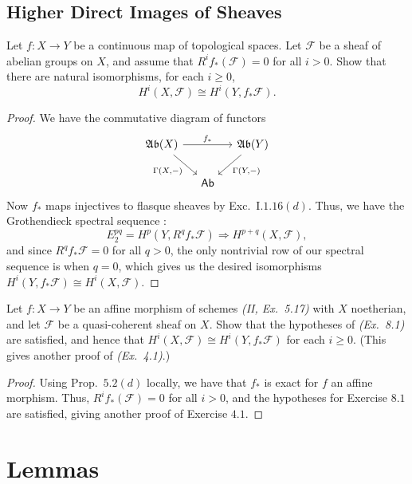 \documentclass[10pt]{article}
\theoremstyle{definition}
\theoremstyle{remark}
\numberwithin{equation}{section}
\numberwithin{figure}{subsubsection}
\newcommand{\FF}{\mathscr{F}}
\begin{document}
\subsection{Higher Direct Images of Sheaves}
\begin{problem}
  Let $f\colon X \to Y$ be a continuous map of topological spaces. Let
  $\mathscr{F}$ be a sheaf of abelian groups on $X$, and assume that
  $R^if_*(\mathscr{F}) = 0$ for all $i > 0$. Show that there are natural
  isomorphisms, for each $i \ge 0$,
  \[ H^i(X,\mathscr{F}) \cong H^i(Y,f_*\mathscr{F}). \]
\end{problem}
\begin{proof}
  We have the commutative diagram of functors
  \begin{equation*}
    \begin{tikzcd}[column sep=small]
      \mathfrak{Ab}(X) \arrow{rr}{f_*}\arrow{dr}[swap]{\Gamma(X,-)} & &
      \mathfrak{Ab}(Y) \arrow{dl}{\Gamma(Y,-)}\\
      & \mathsf{Ab}
    \end{tikzcd}
  \end{equation*}
  Now $f_*$ maps injectives to flasque sheaves by Exc.\ I.$1.16(d)$. Thus, we have
  the Grothendieck spectral sequence \cite[Thm.\ 5.8.3]{Wei94}:
  \begin{equation*}
    E_2^{pq} = H^p(Y,R^qf_*\FF) \Rightarrow H^{p+q}(X,\FF),
  \end{equation*}
  and since $R^qf_*\FF = 0$ for all $q > 0$, the only nontrivial row of our
  spectral sequence is when $q=0$, which gives us the desired isomorphisms
  $H^i(Y,f_*\FF) \cong H^{i}(X,\FF)$.
\end{proof}
\begin{problem}
  Let $f\colon X \to Y$ be an affine morphism of schemes \emph{(II, Ex.\
  5.17)} with $X$ noetherian, and let $\FF$ be a quasi-coherent sheaf on
  $X$. Show that the hypotheses of \emph{(Ex.\ 8.1)} are satisfied, and hence
  that $H^i(X,\FF) \cong H^i(Y,f_*\FF)$ for each $i \ge 0$. (This gives another
  proof of \emph{(Ex.\ 4.1)}.)
\end{problem}
\begin{proof}
  Using Prop.\ $5.2(d)$ locally, we have that $f_*$ is exact for $f$ an affine
  morphism. Thus, $R^if_*(\mathscr{F}) = 0$ for all $i > 0$, and the hypotheses
  for Exercise $8.1$ are satisfied, giving another proof of Exercise $4.1$.
\end{proof}

\appendix
\section{Lemmas}
\end{document}

